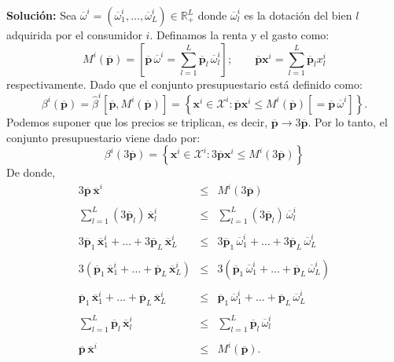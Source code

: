 \begin{enumerate}
	\textbf{Solución:} Sea $\overline{\omega}^i = \left(\overline{\omega}_1^i,\ldots,\overline{\omega}_L^i\right)\in \mathbb{R}^L_+$ donde $\overline{\omega}^i_l$ es la dotación del bien $l$ adquirida por el consumidor $i$. Definamos la renta y el gasto como:
	$$M^i\left(\overline{\textbf{p}}\right)=\left[\overline{\textbf{p}}\, \overline{\omega}^i=\displaystyle\sum_{l=1}^L \overline{\textbf{p}}_l \,\overline{\omega}_l^i\right]; \qquad \overline{\textbf{p}}\textbf{x}^i=\displaystyle\sum_{l=1}^L \overline{\textbf{p}}_l x_l^i$$
	respectivamente. Dado que el conjunto presupuestario está definido como:
	$$\beta^i\left(\overline{\textbf{p}}\right)=\hat{\beta}^i\left[\overline{\textbf{p}},M^i\left(\overline{\textbf{p}}\right)\right]=\left\{\textbf{x}^i\in \mathcal{X}^i:\overline{\textbf{p}}\textbf{x}^i\leq M^i\left(\overline{\textbf{p}}\right)\left[=\overline{\textbf{p}} \,\overline{\omega}^i\right]\right\}.$$
	Podemos suponer que los precios se triplican, es decir, $\overline{\textbf{p}}\rightarrow 3\overline{\textbf{p}}$. Por lo tanto, el conjunto presupuestario viene dado por:
	$$\beta^i\left(3\overline{\textbf{p}}\right)=\left\{\textbf{x}^i\in \mathcal{X}^i:3\overline{\textbf{p}}\textbf{x}^i\leq M^i\left(3\overline{\textbf{p}}\right)\right\}$$
	De donde,
	$$
	\begin{array}{rcl}
	    3\overline{\textbf{p}}\,\overline{\textbf{x}}^i & \leq & M^i\left(3\overline{\textbf{p}}\right)\\\\
	    \displaystyle\sum_{l=1}^L \left(3\overline{\textbf{p}}_l\right) \,\overline{\textbf{x}}_l^i & \leq & \displaystyle\sum_{l=1}^L \left(3\overline{\textbf{p}}_l\right) \,\overline{\omega}_l^i\\\\
	    3\overline{\textbf{p}}_1 \,\overline{\textbf{x}}_1^i + \ldots + 3\overline{\textbf{p}}_L \,\overline{\textbf{x}}_L^i & \leq & 3\overline{\textbf{p}}_1 \,\overline{\omega}_1^i + \ldots + 3\overline{\textbf{p}}_L \,\overline{\omega}_L^i\\\\
	    3\left(\overline{\textbf{p}}_1 \,\overline{\textbf{x}}_1^i + \ldots + \overline{\textbf{p}}_L \,\overline{\textbf{x}}_L^i\right) & \leq & 3\left(\overline{\textbf{p}}_1 \,\overline{\omega}_1^i + \ldots + \overline{\textbf{p}}_L \,\overline{\omega}_L^i\right)\\\\
	    \overline{\textbf{p}}_1 \,\overline{\textbf{x}}_1^i + \ldots + \overline{\textbf{p}}_L \,\overline{\textbf{x}}_L^i & \leq & \overline{\textbf{p}}_1 \,\overline{\omega}_1^i + \ldots + \overline{\textbf{p}}_L \,\overline{\omega}_L^i\\\\
	    \displaystyle\sum_{l=1}^L \overline{\textbf{p}}_l \,\overline{\textbf{x}}_l^i & \leq & \displaystyle\sum_{l=1}^L \overline{\textbf{p}}_l \,\overline{\omega}_l^i\\\\
	    \overline{\textbf{p}}\,\overline{\textbf{x}}^i & \leq & M^i\left(\overline{\textbf{p}}\right).
	\end{array}
	$$


\end{enumerate}
